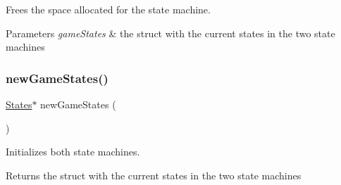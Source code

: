 Frees the space allocated for the state machine. 


\begin{DoxyParams}{Parameters}
{\em game\+States} & the struct with the current states in the two state machines \\
\hline
\end{DoxyParams}
\mbox{\label{group___state_machine_ga1b7814c2c4e8169a8561d47554c0639e}} 
\subsubsection{\texorpdfstring{new\+Game\+States()}{newGameStates()}}
{\footnotesize\ttfamily \hyperlink{struct_states}{States}$\ast$ new\+Game\+States (\begin{DoxyParamCaption}{ }\end{DoxyParamCaption})}



Initializes both state machines. 

\begin{DoxyReturn}{Returns}
the struct with the current states in the two state machines 
\end{DoxyReturn}
